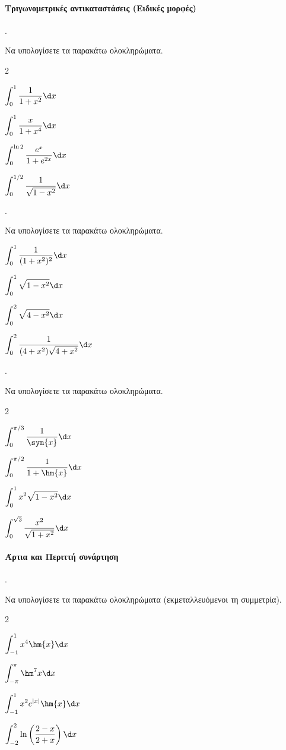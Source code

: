 \documentclass[11pt,a4paper,twocolumn]{article}
\newcounter{askhsh}
\newcommand{\askhsh}{\large\theaskhsh.\ \addtocounter{askhsh}{1}}
\begin{document}
\paragraph{Τριγωνομετρικές αντικαταστάσεις (Ειδικές μορφές)}
\askhsh Να υπολογίσετε τα παρακάτω ολοκληρώματα.
\begin{multicols}{2}
\begin{alist}
\item $\displaystyle\int_{0}^{1} \dfrac{1}{1+x^2} \d x$
\item $\displaystyle\int_{0}^{1} \dfrac{x}{1+x^4} \d x$
\item $\displaystyle\int_{0}^{\ln 2} \dfrac{e^x}{1+e^{2x}} \d x$
\item $\displaystyle\int_{0}^{1/2} \dfrac{1}{\sqrt{1-x^2}} \d x$
\end{alist}
\end{multicols}

\askhsh Να υπολογίσετε τα παρακάτω ολοκληρώματα.
\begin{alist}
\item $\displaystyle\int_{0}^{1} \dfrac{1}{(1+x^2)^2} \d x$
\item $\displaystyle\int_{0}^{1} \sqrt{1-x^2} \d x$
\item $\displaystyle\int_{0}^{2} \sqrt{4-x^2} \d x$
\item $\displaystyle\int_{0}^{2} \dfrac{1}{(4+x^2)\sqrt{4+x^2}} \d x$
\end{alist}

\askhsh Να υπολογίσετε τα παρακάτω ολοκληρώματα.
\begin{multicols}{2}
\begin{alist}
\item $\displaystyle\int_{0}^{\pi/3} \dfrac{1}{\syn{x}} \d x$
\item $\displaystyle\int_{0}^{\pi/2} \dfrac{1}{1+\hm{x}} \d x$
\item $\displaystyle\int_{0}^{1} x^2\sqrt{1-x^2} \d x$
\item $\displaystyle\int_{0}^{\sqrt{3}} \dfrac{x^2}{\sqrt{1+x^2}} \d x$
\end{alist}
\end{multicols}

\paragraph{Άρτια και Περιττή συνάρτηση}
\askhsh Να υπολογίσετε τα παρακάτω ολοκληρώματα (εκμεταλλευόμενοι τη συμμετρία).
\begin{multicols}{2}
\begin{alist}
\item $\displaystyle\int_{-1}^{1} x^4 \hm{x} \d x$
\item $\displaystyle\int_{-\pi}^{\pi} \hm^7{x} \d x$
\item $\displaystyle\int_{-1}^{1} x^2 e^{|x|} \hm{x} \d x$
\item $\displaystyle\int_{-2}^{2} \ln\left(\dfrac{2-x}{2+x}\right) \d x$
\end{alist}
\end{multicols}
\end{document}
